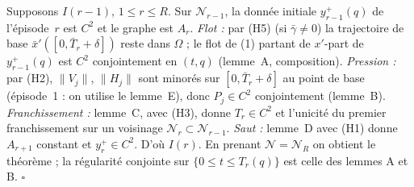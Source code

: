 \documentclass[11pt,a4paper]{article}
\theoremstyle{remark}
\newcommand{\norm}[1]{\lVert #1\rVert}
\begin{document}
Supposons $I(r-1)$, $1\le r\le R$. Sur $\mathcal N_{r-1}$, la donn\'ee initiale $y_{r-1}^+(q)$ de l'\'episode~$r$ est $C^2$ et le graphe est $A_r$. \emph{Flot :} par (H5) (si $\bar\gamma\neq0$) la trajectoire de base $\bar x'([0,\bar T_r+\delta])$ reste dans $\Omega$ ; le flot de (1) partant de $x'$-part de $y_{r-1}^+(q)$ est $C^2$ conjointement en $(t,q)$ (lemme~A, composition). \emph{Pression :} par (H2), $\norm{V_j}$, $\norm{H_j}$ sont minor\'es sur $[0,\bar T_r+\delta]$ au point de base (\'episode~1 : on utilise le lemme~E), donc $P_j\in C^2$ conjointement (lemme~B). \emph{Franchissement :} lemme~C, avec (H3), donne $T_r\in C^2$ et l'unicit\'e du premier franchissement sur un voisinage $\mathcal N_r\subset\mathcal N_{r-1}$. \emph{Saut :} lemme~D avec (H1) donne $A_{r+1}$ constant et $y_r^+\in C^2$. D'o\`u $I(r)$. En prenant $\mathcal N=\mathcal N_R$ on obtient le th\'eor\`eme ; la r\'egularit\'e conjointe sur $\{0\le t\le T_r(q)\}$ est celle des lemmes A et B. $\square$
\end{document}
